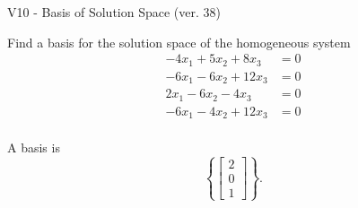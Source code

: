 \begin{exercise}
  \begin{exerciseTitle}V10 - Basis of Solution Space (ver. 38)\end{exerciseTitle}
  \begin{exerciseStatement}
    Find a basis for the solution space of the homogeneous system 
\begin{align*}
 -4 x_ 1 + 5 x_ 2 + 8 x_ 3 &= 0  \\ 
  -6 x_ 1 -6 x_ 2 + 12 x_ 3 &= 0  \\ 
  2 x_ 1 -6 x_ 2 -4 x_ 3 &= 0  \\ 
  -6 x_ 1 -4 x_ 2 + 12 x_ 3 &= 0  \\ 
 \end{align*}


 
  \end{exerciseStatement}

  \begin{exerciseAnswer}
   A basis is   
\[\left\{\left[\begin{array}{c}
2 \\
0 \\
1
\end{array}\right]\right\}.\]

  


  \end{exerciseAnswer}
\end{exercise}
